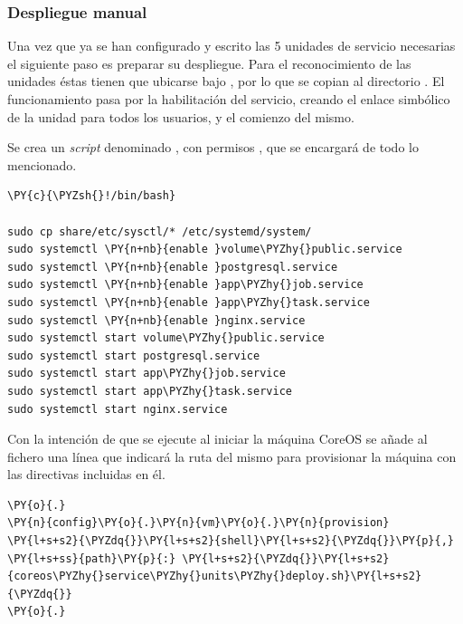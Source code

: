 \subsubsection{Despliegue manual}

Una vez que ya se han configurado y escrito las 5 unidades de servicio necesarias el siguiente paso es preparar su despliegue. Para el reconocimiento de las unidades éstas tienen que ubicarse bajo , por lo que se copian al directorio . El funcionamiento pasa por la habilitación del servicio, creando el enlace simbólico de la unidad para todos los usuarios, y el comienzo del mismo.

Se crea un \textit{script} denominado , con permisos , que se encargará de todo lo mencionado.

\begin{codelisting}
\label{code:coreos-service-units-deploy}
\begin{Verbatim}[fontsize=\relsize{-2.5},fontseries=b,commandchars=\\\{\}]
\PY{c}{\PYZsh{}!/bin/bash}

sudo cp share/etc/sysctl/* /etc/systemd/system/
sudo systemctl \PY{n+nb}{enable }volume\PYZhy{}public.service
sudo systemctl \PY{n+nb}{enable }postgresql.service
sudo systemctl \PY{n+nb}{enable }app\PYZhy{}job.service
sudo systemctl \PY{n+nb}{enable }app\PYZhy{}task.service
sudo systemctl \PY{n+nb}{enable }nginx.service
sudo systemctl start volume\PYZhy{}public.service
sudo systemctl start postgresql.service
sudo systemctl start app\PYZhy{}job.service
sudo systemctl start app\PYZhy{}task.service
sudo systemctl start nginx.service
\end{Verbatim}
\end{codelisting}

Con la intención de que se ejecute al iniciar la máquina CoreOS se añade al fichero  una línea que indicará la ruta del mismo para provisionar la máquina con las directivas incluidas en él.

\begin{codelisting}
\label{code:vagrantfile3}
\begin{Verbatim}[fontsize=\relsize{-2.5},fontseries=b,commandchars=\\\{\}]
\PY{o}{.}
\PY{n}{config}\PY{o}{.}\PY{n}{vm}\PY{o}{.}\PY{n}{provision} \PY{l+s+s2}{\PYZdq{}}\PY{l+s+s2}{shell}\PY{l+s+s2}{\PYZdq{}}\PY{p}{,} \PY{l+s+ss}{path}\PY{p}{:} \PY{l+s+s2}{\PYZdq{}}\PY{l+s+s2}{coreos\PYZhy{}service\PYZhy{}units\PYZhy{}deploy.sh}\PY{l+s+s2}{\PYZdq{}}
\PY{o}{.}
\end{Verbatim}
\end{codelisting}

